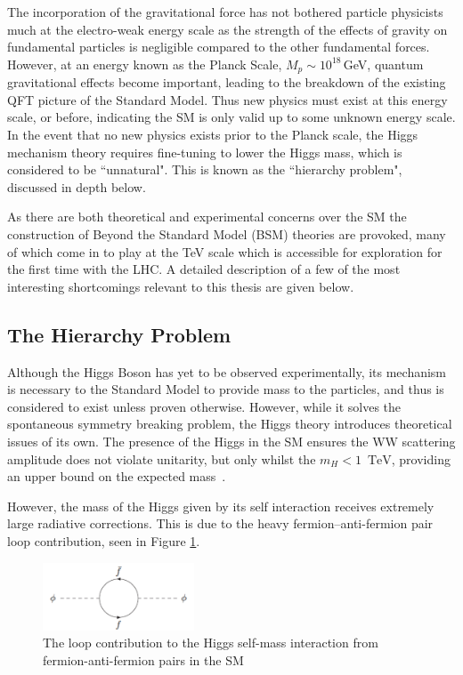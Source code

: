 The incorporation of the gravitational force has not bothered particle physicists much at the electro-weak energy scale as the strength of the effects of gravity on fundamental particles is negligible compared to the other fundamental forces. However, at an energy known as the Planck Scale, $M_{p} \sim 10^{18}$\,GeV, quantum gravitational effects become important, leading to the breakdown of the existing QFT picture of the Standard Model. Thus new physics must exist at this energy scale, or before, indicating the SM is only valid up to some unknown energy scale. In the event that no new physics exists prior to the Planck scale, the Higgs mechanism theory requires fine-tuning to lower the Higgs mass, which is considered to be ``unnatural". This is known as the ``hierarchy problem", discussed in depth below.

As there are both theoretical and experimental concerns over the SM the construction of Beyond the Standard Model (BSM) theories are provoked, many of which come in to play at the TeV scale which is accessible for exploration for the first time with the LHC. A detailed description of a few of the most interesting shortcomings relevant to this thesis are given below.

\subsection{The Hierarchy Problem}
Although the Higgs Boson has yet to be observed experimentally, its mechanism is necessary to the Standard Model to provide mass to the particles, and thus is considered to exist unless proven otherwise. However, while it solves the spontaneous symmetry breaking problem, the Higgs theory introduces theoretical issues of its own. The presence of the Higgs in the SM ensures the WW scattering amplitude does not violate unitarity, but only whilst the $m_{H} < 1$~$\textrm{TeV}$, providing an upper bound on the expected mass~\cite{WWHMass}. 

However, the mass of the Higgs given by its self interaction receives extremely large radiative corrections. This is due to the heavy fermion--anti-fermion pair loop contribution, seen in Figure \ref{fig:hiloop}. 

\begin{figure}
\centering
\includegraphics[width=0.4\textwidth]{Figures/Theory/higgsself}
\caption{\label{fig:hiloop}The loop contribution to the Higgs self-mass interaction from fermion-anti-fermion pairs in the SM}
\end{figure}

